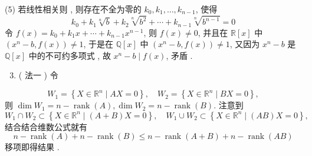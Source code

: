 \documentclass[10pt]{article}
\begin{document}
(5)  若线性相关则 ,  则存在不全为零的  $k_{0}, k_{1}, \ldots, k_{n-1}$,  使得 
$$
k_{0}+k_{1} \sqrt[n]{b}+k_{2} \sqrt[n]{b^{2}}+\cdots+k_{n-1} \sqrt[n]{b^{n-1}}=0
$$
 令  $f(x)=k_{0}+k_{1} x+\cdots+k_{n-1} x^{n-1}$,  则  $f(x) \neq 0$,  并且在  $\mathbb{R}[x]$  中  $\left(x^{n}-b, f(x)\right) \neq 1$,  于是在  $\mathbb{Q}[x]$  中  $\left(x^{n}-b, f(x)\right) \neq 1$,  又因为  $x^{n}-b$  是  $\mathbb{Q}[x]$  中的不可约多项式 ,  故  $x^{n}-b \mid f(x)$,  矛盾 .

\begin{enumerate}
  \setcounter{enumi}{2}
  \item ( 法一 )  令 
\end{enumerate}
$$
W_{1}=\left\{X \in \mathbb{R}^{n} \mid A X=0\right\}, \quad W_{2}=\left\{X \in \mathbb{R}^{n} \mid B X=0\right\},
$$
 则  $\operatorname{dim} W_{1}=n-\operatorname{rank}(A), \operatorname{dim} W_{2}=n-\operatorname{rank}(B)$.  注意到 
$$
W_{1} \cap W_{2} \subset\left\{X \in \mathbb{R}^{n} \mid(A+B) X=0\right\}, \quad W_{1} \cup W_{2} \subset\left\{X \in \mathbb{R}^{n} \mid(A B) X=0\right\},
$$
 结合结合维数公式就有 
$$
n-\operatorname{rank}(A)+n-\operatorname{rank}(B) \leqslant n-\operatorname{rank}(A+B)+n-\operatorname{rank}(A B)
$$
 移项即得结果 .
\end{document}
